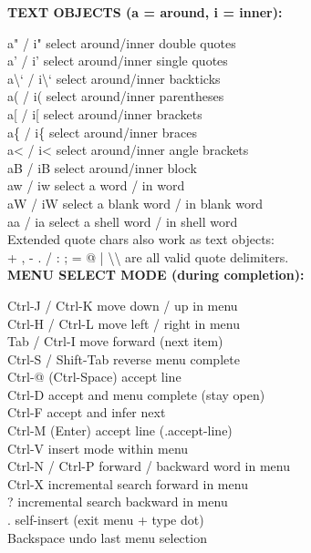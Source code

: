 \documentclass[11pt,a4paper,twoside]{book}
\begin{document}
\vspace{12pt}
{\bfseries\color{neonyellow} TEXT OBJECTS (a = around, i = inner):}\vspace{4pt}

a" / i"              select around/inner double quotes\\
a' / i'              select around/inner single quotes\\
a\textbackslash{}` / i\textbackslash{}`              select around/inner backticks\\
a( / i(              select around/inner parentheses\\
a[ / i[              select around/inner brackets\\
a\{ / i\{              select around/inner braces\\
a< / i<              select around/inner angle brackets\\
aB / iB              select around/inner block\\
aw / iw              select a word / in word\\
aW / iW              select a blank word / in blank word\\
aa / ia              select a shell word / in shell word\\

Extended quote chars also work as text objects:\\
+ , - . / : ; = @ | \textbackslash{}\textbackslash{} are all valid quote delimiters.\\


\vspace{12pt}
{\bfseries\color{neonyellow} MENU SELECT MODE (during completion):}\vspace{4pt}

Ctrl-J / Ctrl-K       move down / up in menu\\
Ctrl-H / Ctrl-L       move left / right in menu\\
Tab / Ctrl-I          move forward (next item)\\
Ctrl-S / Shift-Tab    reverse menu complete\\
Ctrl-@ (Ctrl-Space)   accept line\\
Ctrl-D                accept and menu complete (stay open)\\
Ctrl-F                accept and infer next\\
Ctrl-M (Enter)        accept line (.accept-line)\\
Ctrl-V                insert mode within menu\\
Ctrl-N / Ctrl-P       forward / backward word in menu\\
Ctrl-X                incremental search forward in menu\\
?                     incremental search backward in menu\\
.                     self-insert (exit menu + type dot)\\
Backspace             undo last menu selection\\
\end{document}
